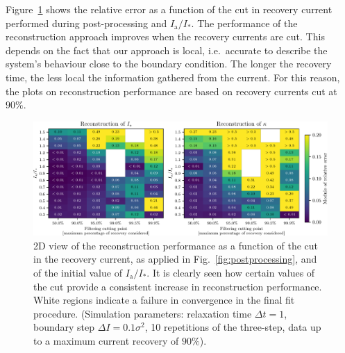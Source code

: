 Figure~\ref{fig:different_cut} shows the relative error as a function of the cut in recovery current performed during post-processing and $I_\mathrm{a}/I_\ast$. The performance of the reconstruction approach improves when the recovery currents are cut. This depends on the fact that our approach is local, i.e.\ accurate to describe the system's behaviour close to the boundary condition. The longer the recovery time, the less local the information gathered from the current. For this reason, the plots on reconstruction performance are based on recovery currents cut at $90\%$. 

\begin{figure}[htp]
    \centering
    \includegraphics[width=\textwidth]{4_probing_the_diffusive_behavior/figs/final/MULTI_different_filter.pdf}
    \caption{2D view of the reconstruction performance as a function of the cut in the recovery current, as applied in Fig.~\ref{fig:postprocessing}, and of the initial value of $I_\mathrm{a}/I_\ast$. It is clearly seen how certain values of the cut provide a consistent increase in reconstruction performance. White regions indicate a failure in convergence in the final fit procedure. (Simulation parameters: relaxation time $\Delta t=1$, boundary step $\Delta I=0.1 \sigma^2$, 10 repetitions of the three-step, data up to a maximum current recovery of $90\%$).}
    \label{fig:different_cut}
\end{figure}

